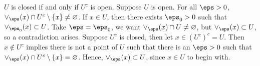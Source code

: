 

\begin{theorem}{
    $U$ is closed if and only if $U^c$ is open.
}
    Suppose $U$ is open.
    For all $\eps > 0$, $\vee_{\eps} (x)\cap U^c\setminus\{x\}\neq\varnothing$.
    If $x\in U$, then there exists $\eps_0 > 0$ such that $\vee_{\eps_0} (x)\subset U$.
    Take $\eps = \eps_0$, we want $\vee_{\eps}(x)\cap U\neq \varnothing$, but $\vee_{\eps} (x)\subset U$, so a contradiction arises.
    Suppose $U^c$ is closed, then let $x\in (U^c)^c = U$.
    Then $x\notin U^c$ implies there is not a point of $U$ such that there is an $\eps > 0$ such that $\vee_{\eps} (x)\cap U^c\setminus\{x\} = \varnothing$.
    Hence, $\vee_{\eps} (x)\subset U$, since $x\in U$ to begin with.
\end{theorem}
